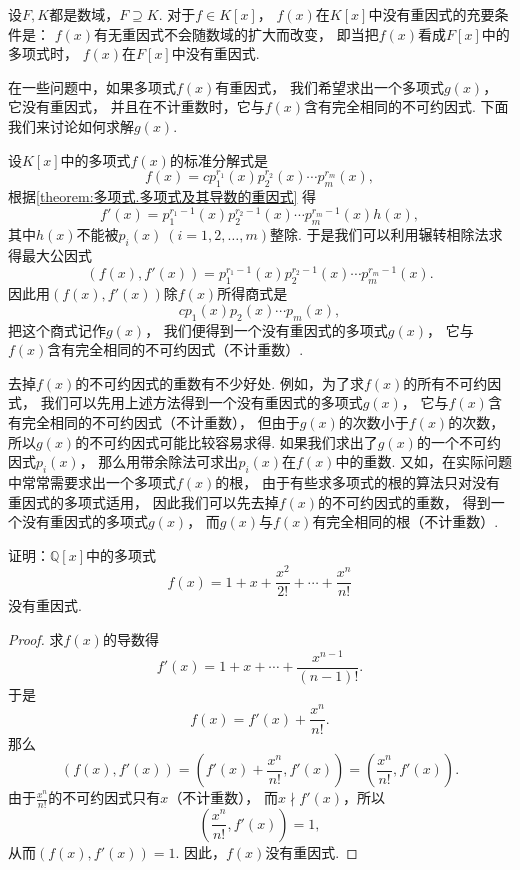 \begin{proposition}
设\(F,K\)都是数域，\(F \supseteq K\).
对于\(f \in K[x]\)，
\(f(x)\)在\(K[x]\)中没有重因式的充要条件是：
\(f(x)\)有无重因式不会随数域的扩大而改变，
即当把\(f(x)\)看成\(F[x]\)中的多项式时，
\(f(x)\)在\(F[x]\)中没有重因式.
\end{proposition}

在一些问题中，如果多项式\(f(x)\)有重因式，
我们希望求出一个多项式\(g(x)\)，
它没有重因式，
并且在不计重数时，它与\(f(x)\)含有完全相同的不可约因式.
下面我们来讨论如何求解\(g(x)\).

设\(K[x]\)中的多项式\(f(x)\)的标准分解式是\[
	f(x) = c p_1^{r_1}(x) p_2^{r_2}(x) \dotsm p_m^{r_m}(x),
\]
根据\cref{theorem:多项式.多项式及其导数的重因式} 得\[
	f'(x) = p_1^{r_1-1}(x) p_2^{r_2-1}(x) \dotsm p_m^{r_m-1}(x) h(x),
\]
其中\(h(x)\)不能被\(p_i(x)\ (i=1,2,\dotsc,m)\)整除.
于是我们可以利用辗转相除法求得最大公因式\[
	(f(x),f'(x))
	= p_1^{r_1-1}(x) p_2^{r_2-1}(x) \dotsm p_m^{r_m-1}(x).
\]
因此用\((f(x),f'(x))\)除\(f(x)\)所得商式是\[
	c p_1(x) p_2(x) \dotsm p_m(x),
\]
把这个商式记作\(g(x)\)，
我们便得到一个没有重因式的多项式\(g(x)\)，
它与\(f(x)\)含有完全相同的不可约因式（不计重数）.

去掉\(f(x)\)的不可约因式的重数有不少好处.
例如，为了求\(f(x)\)的所有不可约因式，
我们可以先用上述方法得到一个没有重因式的多项式\(g(x)\)，
它与\(f(x)\)含有完全相同的不可约因式（不计重数），
但由于\(g(x)\)的次数小于\(f(x)\)的次数，
所以\(g(x)\)的不可约因式可能比较容易求得.
如果我们求出了\(g(x)\)的一个不可约因式\(p_i(x)\)，
那么用带余除法可求出\(p_i(x)\)在\(f(x)\)中的重数.
又如，在实际问题中常常需要求出一个多项式\(f(x)\)的根，
由于有些求多项式的根的算法只对没有重因式的多项式适用，
因此我们可以先去掉\(f(x)\)的不可约因式的重数，
得到一个没有重因式的多项式\(g(x)\)，
而\(g(x)\)与\(f(x)\)有完全相同的根（不计重数）.

\begin{example}
证明：\(\mathbb{Q}[x]\)中的多项式\[
	f(x) = 1+x+\frac{x^2}{2!}+\dotsb+\frac{x^n}{n!}
\]没有重因式.
\begin{proof}
求\(f(x)\)的导数得\[
	f'(x) = 1+x+\dotsm+\frac{x^{n-1}}{(n-1)!}.
\]
于是\[
	f(x) = f'(x) + \frac{x^n}{n!}.
\]
那么\[
	(f(x),f'(x))
	= \left(
		f'(x)+\frac{x^n}{n!},
		f'(x)
	\right)
	= \left(
		\frac{x^n}{n!},
		f'(x)
	\right).
\]
由于\(\frac{x^n}{n!}\)的不可约因式只有\(x\)（不计重数），
而\(x \nmid f'(x)\)，所以\[
	\left(
		\frac{x^n}{n!},
		f'(x)
	\right)
	= 1,
\]
从而\((f(x),f'(x))=1\).
因此，\(f(x)\)没有重因式.
\end{proof}
\end{example}
